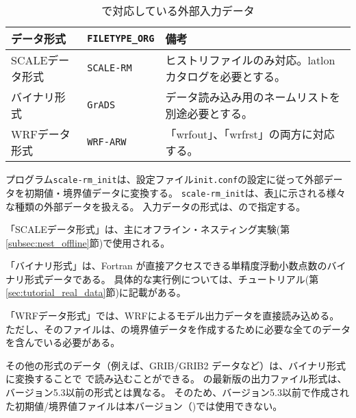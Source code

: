 \section{\SecInputDataSetting} \label{sec:adv_datainput}

\begin{table}[htb]
\begin{center}
\caption{\scalelib で対応している外部入力データ}
\begin{tabularx}{150mm}{|l|l|X|} \hline
 \rowcolor[gray]{0.9} データ形式      & \verb|FILETYPE_ORG|  & 備考 \\ \hline
 SCALEデータ形式   & \verb|SCALE-RM|     &  ヒストリファイルのみ対応。latlonカタログを必要とする。 \\ \hline
 バイナリ形式 & \verb|GrADS|        & データ読み込み用のネームリストを別途必要とする。       \\ \hline
 WRFデータ形式     & \verb|WRF-ARW|      & 「wrfout」、「wrfrst」の両方に対応する。          \\ \hline
\end{tabularx}
\label{tab:inputdata_format}
\end{center}
\end{table}

プログラム\verb|scale-rm_init|は、設定ファイル\verb|init.conf|の設定に従って外部データを初期値・境界値データに変換する。
\verb|scale-rm_init|は、表\ref{tab:inputdata_format}に示される様々な種類の外部データを扱える。
入力データの形式は、ので指定する。

「SCALEデータ形式」は、主にオフライン・ネスティング実験(第\ref{subsec:nest_offline}節)で使用される。


「バイナリ形式」は、Fortran が直接アクセスできる単精度浮動小数点数のバイナリ形式データである。
具体的な実行例については、チュートリアル(第\ref{sec:tutorial_real_data}節)に記載がある。

「WRFデータ形式」では、WRFによるモデル出力データを直接読み込める。
ただし、そのファイルは、{\scalerm}の境界値データを作成するために必要な全てのデータを含んでいる必要がある。

その他の形式のデータ（例えば、GRIB/GRIB2 データなど）は、バイナリ形式に変換することで {\scalerm} で読み込むことができる。
{\scalelib}の最新版の出力ファイル形式は、バージョン5.3以前の形式とは異なる。
そのため、バージョン5.3以前で作成された初期値/境界値ファイルは本バージョン（{\scalelib}{\version})では使用できない。

